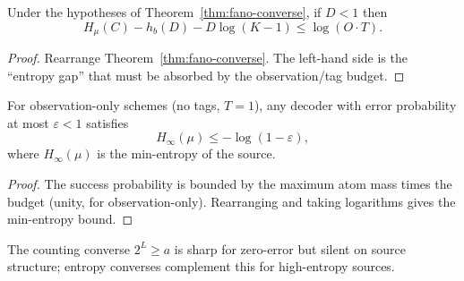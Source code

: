 \begin{corollary}\label{cor:budget-from-error}
Under the hypotheses of Theorem~\ref{thm:fano-converse}, if $D < 1$ then
\[
H_\mu(C) - h_b(D) - D \log(K-1) \le \log(O \cdot T).
\]
\end{corollary}

\begin{proof}
Rearrange Theorem~\ref{thm:fano-converse}. The left-hand side is the ``entropy gap'' that must be absorbed by the observation/tag budget.
\end{proof}

\begin{theorem}\label{thm:min-entropy-bound}
For observation-only schemes (no tags, $T=1$), any decoder with error probability at most $\varepsilon < 1$ satisfies
\[
H_\infty(\mu) \le -\log(1 - \varepsilon),
\]
where $H_\infty(\mu)$ is the min-entropy of the source.
\end{theorem}

\begin{proof}
The success probability is bounded by the maximum atom mass times the budget (unity, for observation-only). Rearranging and taking logarithms gives the min-entropy bound.
\end{proof}

\begin{remark}
The counting converse $2^L \ge a$ is sharp for zero-error but silent on source structure; entropy converses complement this for high-entropy sources. 
\end{remark}
